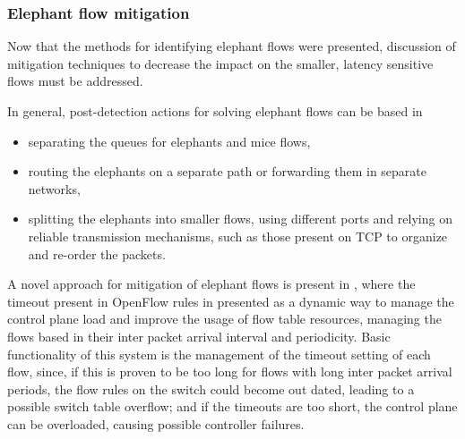 \subsubsection{Elephant flow mitigation}

Now that the methods for identifying elephant flows were presented, discussion of mitigation techniques to decrease the impact on the smaller, latency sensitive
flows must be addressed. 

\par In general, post-detection actions for solving elephant flows can be based in \cite{pettit_open_2014, noauthor_mice_2013}

\begin{itemize}
    \item separating the queues for elephants and mice flows,
    \item routing the elephants on a separate path or forwarding them in separate networks,
    \item splitting the elephants into smaller flows, using different ports and relying on reliable transmission mechanisms, such as those present on TCP
        to organize and re-order the packets.
\end{itemize}

\par A novel approach for mitigation of elephant flows is present in \cite{zhu_intelligent_2015}, where the timeout present in OpenFlow rules in presented as 
a dynamic way to manage the control plane load and improve the usage of flow table resources, managing the flows based in their inter packet arrival interval and
periodicity. Basic functionality of this system is the management of the timeout setting of each flow, since, if this is proven to be too long for flows with 
long inter packet arrival periods, the flow rules on the switch could become out dated, leading to a possible switch table overflow; and if the timeouts are 
too short, the control plane can be overloaded, causing possible controller failures.

